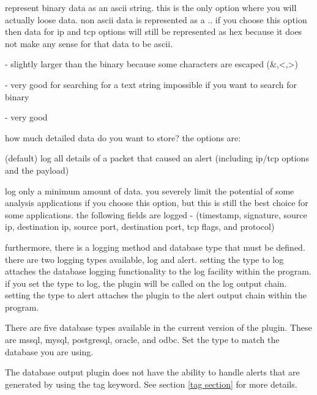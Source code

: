 \documentclass[english]{report}
\newenvironment{note}{
    \vspace{10pt}{\textsf{
        {\Huge{$\triangle$\hspace{-12.5pt}{\Large{$^!$}}}}\hspace{5pt}
        {\Large{NOTE}}
    }
    }

    \begin{center}
    \par\vspace{-10pt}
    \begin{lrbox}{\savepar}
    \begin{minipage}[r]{6.2in}
}
{
    \end{minipage}
    \end{lrbox}
    \fbox{
        \usebox{
            \savepar
        }
    }
    \par\vskip10pt
    \end{center}
}
\begin{document}
\begin{description}{}
\begin{description}{}
      \item [ascii]represent binary data as an ascii string. this is
      the only option where you will actually loose data. non ascii
      data is represented as a .. if you choose this option then data
      for ip and tcp options will still be represented as hex because
      it does not make any sense for that data to be ascii.

\begin{description}{}
\item [storage~requirements]- slightly larger than the binary because
some characters are escaped (\&,<,>)
\item [searchability]- very good for searching for a text string impossible
if you want to search for binary 
\item [human~readability]- very good
\end{description}
\end{description}
\item [detail]how much detailed data do you want to store? the options
are:

\begin{description}{}
\item [full](default) log all details of a packet that caused an alert
(including ip/tcp options and the payload)
\item [fast]log only a minimum amount of data. you severely limit the potential
of some analysis applications if you choose this option, but this
is still the best choice for some applications. the following fields
are logged - (timestamp, signature, source ip, destination ip, source
port, destination port, tcp flags, and protocol)
\end{description}
\end{description}
furthermore, there is a logging method and database type that must
be defined. there are two logging types available, log and alert.
setting the type to log attaches the database logging functionality
to the log facility within the program. if you set the type to log,
the plugin will be called on the log output chain. setting the type
to alert attaches the plugin to the alert output chain within the
program.

There are five database types available in the current version of the plugin.
These are mssql, mysql, postgresql, oracle, and odbc.  Set the type to match
the database you are using.

\begin{note}
The database output plugin does not have the ability to handle alerts that are
generated by using the tag keyword.  See section \ref{tag section} for more
details.
\end{note}
\end{document}
